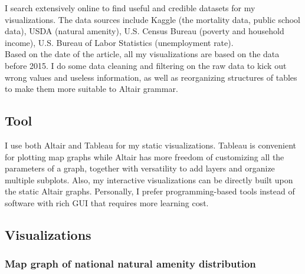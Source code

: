 \documentclass{article}
\begin{document}
I search extensively online to find useful and credible datasets for my visualizations. The data sources include Kaggle (the mortality data, public school data), USDA (natural amenity), U.S. Census Bureau (poverty and household income), U.S. Bureau of Labor Statistics (unemployment rate). \\
\noindent
Based on the date of the article, all my visualizations are based on the data before 2015. I do some data cleaning and filtering on the raw data to kick out wrong values and useless information, as well as reorganizing structures of tables to make them more suitable to Altair grammar.

\subsection*{Tool}

I use both Altair and Tableau for my static visualizations. Tableau is convenient for plotting map graphs while Altair has more freedom of customizing all the parameters of a graph, together with versatility to add layers and organize multiple subplots. Also, my interactive visualizations can be directly built upon the static Altair graphs. Personally, I prefer programming-based tools instead of software with rich GUI that requires more learning cost.

\subsection*{Visualizations}

\subsubsection*{Map graph of national natural amenity distribution}
\end{document}
